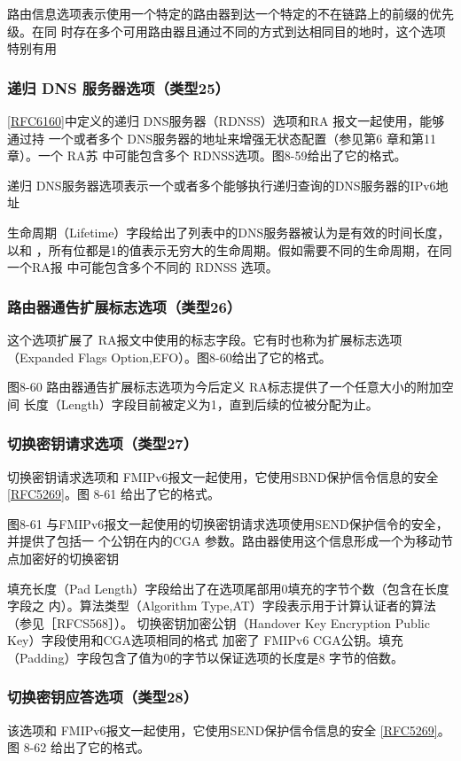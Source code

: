 路由信息选项表示使用一个特定的路由器到达一个特定的不在链路上的前缀的优先级。在同
时存在多个可用路由器且通过不同的方式到达相同目的地时，这个选项特别有用

\subsubsection{递归 DNS 服务器选项（类型25）}

\href{https://www.rfc-editor.org/rfc/rfc6160}{[RFC6160]}中定义的递归 DNS服务器（RDNSS）选项和RA 报文一起使用，能够通过持
一个或者多个 DNS服务器的地址来增强无状态配置（参见第6 章和第11章）。一个 RA苏
中可能包含多个 RDNSS选项。图8-59给出了它的格式。

递归 DNS服务器选项表示一个或者多个能够执行递归查询的DNS服务器的IPv6地址

生命周期（Lifetime）字段给出了列表中的DNS服务器被认为是有效的时间长度，以和
，所有位都是1的值表示无穷大的生命周期。假如需要不同的生命周期，在同一个RA报
中可能包含多个不同的 RDNSS 选项。

\subsubsection{路由器通告扩展标志选项（类型26）}
这个选项扩展了 RA报文中使用的标志字段。它有时也称为扩展标志选项（Expanded
Flags Option,EFO）。图8-60给出了它的格式。

图8-60 路由器通告扩展标志选项为今后定义 RA标志提供了一个任意大小的附加空间
长度（Length）字段目前被定义为1，直到后续的位被分配为止。

\subsubsection{切换密钥请求选项（类型27）}
切换密钥请求选项和 FMIPv6报文一起使用，它使用SBND保护信令信息的安全
\href{https://www.rfc-editor.org/rfc/rfc5269}{[RFC5269]}。图 8-61 给出了它的格式。

图8-61 与FMIPv6报文一起使用的切换密钥请求选项使用SEND保护信令的安全，并提供了包括一
个公钥在内的CGA 参数。路由器使用这个信息形成一个为移动节点加密好的切换密钥

填充长度（Pad Length）字段给出了在选项尾部用0填充的字节个数（包含在长度字段之
内）。算法类型（Algorithm Type,AT）字段表示用于计算认证者的算法（参见［RFCS568］）。
切换密钥加密公钥（Handover Key Encryption Public Key）字段使用和CGA选项相同的格式
加密了 FMIPv6 CGA公钥。填充（Padding）字段包含了值为0的字节以保证选项的长度是8
字节的倍数。

\subsubsection{切换密钥应答选项（类型28）}
该选项和 FMIPv6报文一起使用，它使用SEND保护信令信息的安全 \href{https://www.rfc-editor.org/rfc/rfc5269}{[RFC5269]}。
图 8-62 给出了它的格式。

